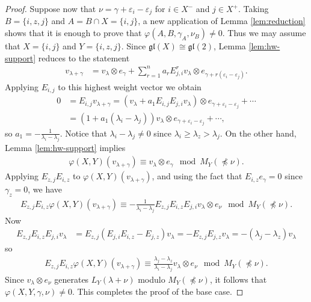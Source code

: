 \documentclass[11pt,fleqn]{amsart}
\renewcommand\phi{\varphi}
\renewcommand\epsilon{\varepsilon}
\theoremstyle{definition}
\theoremstyle{remark}
\theoremstyle{remark}
\newcommand\gl{\mathfrak{gl}}
\newcommand\map[4]{\phi(#3,#4,#1,#2)}
\begin{document}
\begin{proof}
Suppose now that $\nu = \gamma + \epsilon_i - \epsilon_j$ for $i \in X^-$ and 
$j \in X^+$. Taking $B = \{i,z,j\}$ and $A = B \cap X = \{i,j\}$, a new 
application of Lemma \ref{lem:reduction} shows that it is enough to prove that
$\map{\gamma_A}{\nu_B}{A}{B} \neq 0$. Thus we may assume that $X = \{i,j\}$ and 
$Y = \{i,z,j\}$. Since $\gl(X)\cong \gl(2)$, Lemma \ref{lem:hw-support} reduces to the statement
\begin{align*}
v_{\lambda + \gamma}
  &= v_\lambda \otimes e_\gamma + \sum_{r = 1}^n a_r E_{j,i}^r v_\lambda \otimes
    e_{\gamma + r(\epsilon_i - \epsilon_j)}.
\end{align*}
Applying $E_{i,j}$ to this highest weight vector we obtain
\begin{align*}
  0 &= E_{i,j} v_{\lambda + \gamma} = (v_\lambda + a_1E_{i,j}E_{j,i} v_\lambda) 
      \otimes e_{\gamma + \epsilon_i - \epsilon_j} + \cdots \\
    &= (1 + a_1(\lambda_i - \lambda_j))v_\lambda \otimes e_{\gamma + \epsilon_i 
      - \epsilon_j} + \cdots,
\end{align*}
so $a_1 = -\frac{1}{\lambda_i - \lambda_j}$. Notice that $\lambda_i - \lambda_j 
\neq 0$ since $\lambda_i \geq \lambda_z > \lambda_j$.
On the other hand, Lemma \ref{lem:hw-support} implies
\begin{align*}
  \phi(X,Y)(v_{\lambda + \gamma}) 
    \equiv v_\lambda \otimes e_\gamma \mod M_Y(\npreceq \nu).
\end{align*}
Applying $E_{z,j}E_{i,z}$ to $\phi(X,Y)(v_{\lambda + \gamma})$, and using the 
fact that $E_{i,z} e_\gamma = 0$ since $\gamma_z = 0$, we have
\begin{align*}
  E_{z,j}E_{i,z}\phi(X,Y)(v_{\lambda + \gamma}) 
    \equiv
      - \frac{1}{\lambda_i - \lambda_j} E_{z,j}E_{i,z}E_{j,i} v_\lambda 
      \otimes e_\nu \mod M_Y(\npreceq \nu).
\end{align*}
Now
\begin{align*}
  E_{z,j}E_{i,z}E_{j,i} v_\lambda
    &= E_{z,j} (E_{j,i}E_{i,z} - E_{j,z})v_\lambda 
    = - E_{z,j}E_{j,z} v_\lambda
    = -(\lambda_j - \lambda_z)v_\lambda
\end{align*}
so
\begin{align*}
  E_{z,j}E_{i,z}\phi(X,Y)(v_{\lambda + \gamma}) 
    \equiv
      \frac{\lambda_j - \lambda_z}{\lambda_i - \lambda_j} 
        v_\lambda \otimes e_\nu \mod M_Y(\npreceq \nu).
\end{align*}
Since $v_\lambda \otimes e_\nu$ generates $L_Y(\lambda + \nu)$ modulo 
$M_Y(\npreceq \nu)$, it follows that $\map{\gamma}{\nu}{X}{Y} \neq 0$. This 
completes the proof of the base case.


\end{proof}
\end{document}
